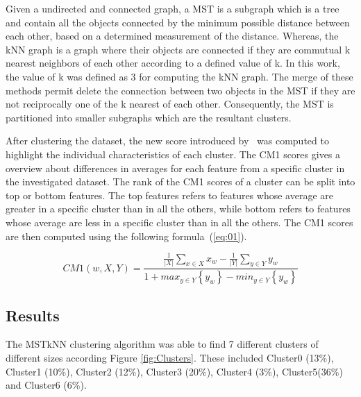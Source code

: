 \documentclass{article}
\begin{document}
Given a undirected and connected graph, a MST is a subgraph which is a tree and
contain all the objects connected by the minimum possible distance between each
other, based on a determined measurement of the distance. Whereas, the kNN graph
is a graph where their objects are connected if they are commutual k nearest
neighbors of each other according to a defined value of k. In this work, the
value of k was defined as 3 for computing the kNN graph. The merge of these
methods permit delete the connection between two objects in the MST if they are
not reciprocally one of the k nearest of each other. Consequently, the MST is
partitioned into smaller subgraphs which are the resultant clusters.



After clustering the dataset, the new score introduced by~\cite{Marsden2013}
was computed to highlight the individual characteristics of each cluster. The
CM1 scores gives a overview about differences in averages for each feature from
a specific cluster in the investigated dataset. The rank of the CM1 scores of a
cluster can be split into top or bottom features. The top features refers to
features whose average are greater in a specific cluster than in all the others,
while bottom refers to features whose average are less in a specific cluster
than in all the others. The CM1 scores are then computed using the following
formula~(\ref{eq:01}).

\begin{equation}
CM1(w,X,Y) = \frac{\frac{1}{\left|X\right|}  \sum_{x \in X} x_{w} - \frac{1}{\left|Y\right|}  \sum_{y \in Y} y_{w}} {1 + max_{y \in Y } \left\{ y_{w} \right\}- min_{y \in Y} \left\{y_{w}\right\} } \label{eq:01}
\end{equation}



\subsection{Results}

The MSTkNN clustering algorithm was able to find 7 different clusters of
different sizes according Figure \ref{fig:Clusters}. These included Cluster0
(13\%), Cluster1 (10\%), Cluster2 (12\%), Cluster3 (20\%), Cluster4 (3\%),
Cluster5(36\%) and Cluster6 (6\%).
\end{document}
